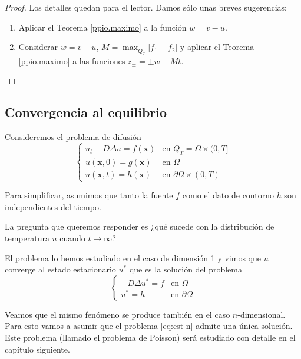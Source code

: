 \documentclass[12pt, a4paper]{amsbook}
\newcommand{\xx}{{\mathbf x}}
\theoremstyle{remark}
\theoremstyle{definition}
\numberwithin{section}{chapter}
\numberwithin{subsection}{section}
\numberwithin{equation}{section}
\numberwithin{figure}{chapter}
\begin{document}
\begin{proof}
Los detalles quedan para el lector. Damos sólo unas breves sugerencias:
\begin{enumerate}
\item Aplicar el Teorema \ref{ppio.maximo} a la función $w=v-u$.

\item Considerar $w=v-u$, $M=\max_{\overline Q_T} |f_1 - f_2|$ y aplicar el Teorema \ref{ppio.maximo} a las funciones $z_{\pm} = \pm w - Mt$.
\end{enumerate}
\end{proof}

\subsection{Convergencia al equilibrio}\label{sec:convergencia.equilibrio}

Consideremos el problema de difusión
\begin{equation}\label{eq:heat-n}
\begin{cases}
u_t - D\Delta u = f(\xx) & \text{en } Q_T = \Omega\times (0,T]\\
u(\xx, 0) = g(\xx) & \text{en } \Omega\\
u(\xx, t) = h(\xx) & \text{en }\partial\Omega\times (0,T)
\end{cases}
\end{equation}

Para simplificar, asumimos que tanto la fuente $f$ como el dato de contorno $h$ son independientes del tiempo.

La pregunta que queremos responder es ¿qué sucede con la distribución de temperatura $u$ cuando $t\to\infty$?

El problema lo hemos estudiado en el caso de dimensión 1 y vimos que $u$ converge al estado estacionario $u^*$ que es la solución del problema
\begin{equation}\label{eq:est-n}
\begin{cases}
-D\Delta u^* = f & \text{en }\Omega\\
u^* = h & \text{en }\partial\Omega
\end{cases}
\end{equation}


Veamos que el mismo fenómeno se produce también en el caso $n$-dimensional. Para esto vamos a asumir que el problema \eqref{eq:est-n} admite una única solución. Este problema (llamado el problema de Poisson) será estudiado con detalle en el capítulo siguiente.
\end{document}
